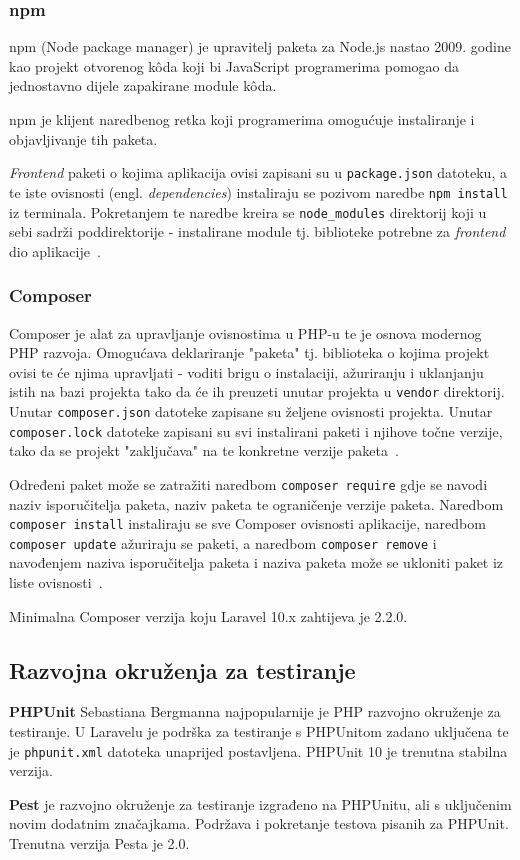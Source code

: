\subsubsection{npm}
npm (Node package manager) je upravitelj paketa za Node.js nastao 2009. godine kao projekt otvorenog k\^oda koji bi JavaScript programerima pomogao da jednostavno dijele zapakirane module k\^oda.

npm je klijent naredbenog retka koji programerima omogućuje instaliranje i objavljivanje tih paketa.

\textit{Frontend} paketi o kojima aplikacija ovisi zapisani su u \texttt{package.json} datoteku, a te iste ovisnosti (engl. \textit{dependencies}) instaliraju se pozivom naredbe \texttt{npm install} iz terminala. Pokretanjem te naredbe kreira se \texttt{node\_modules} direktorij koji u sebi sadrži poddirektorije - instalirane module tj. biblioteke potrebne za \textit{frontend} dio aplikacije~\cite{npm}.

\subsubsection{Composer}
Composer je alat za upravljanje ovisnostima u PHP-u te je osnova modernog PHP razvoja. Omogućava deklariranje "paketa" tj. biblioteka o kojima projekt ovisi te će njima upravljati - voditi brigu o instalaciji, ažuriranju i uklanjanju istih na bazi projekta tako da će ih preuzeti unutar projekta u \texttt{vendor} direktorij. Unutar \texttt{composer.json}
datoteke zapisane su željene ovisnosti projekta. Unutar \texttt{composer.lock} datoteke zapisani su svi instalirani paketi i njihove točne verzije, tako da se projekt "zaključava" na te konkretne verzije paketa~\cite{composerIntro}.

Određeni paket može se zatražiti naredbom \texttt{composer require} gdje se navodi naziv isporučitelja paketa, naziv paketa te ograničenje verzije paketa. Naredbom \texttt{composer install} instaliraju se sve Composer ovisnosti aplikacije, naredbom \texttt{composer update} ažuriraju se paketi, a naredbom \texttt{composer remove} i navođenjem naziva isporučitelja paketa i naziva paketa može se ukloniti paket iz liste ovisnosti~\cite{composerUsage}.

Minimalna Composer verzija koju Laravel 10.x zahtijeva je 2.2.0.

\subsection{Razvojna okruženja za testiranje}
\textbf{PHPUnit} Sebastiana Bergmanna najpopularnije je PHP razvojno okruženje za testiranje. U Laravelu je podrška za testiranje s PHPUnitom zadano uključena te je \texttt{phpunit.xml} datoteka unaprijed postavljena. PHPUnit 10 je trenutna stabilna verzija.

\textbf{Pest} je razvojno okruženje za testiranje izgrađeno na PHPUnitu, ali s uključenim novim dodatnim značajkama. Podržava i pokretanje testova pisanih za PHPUnit. Trenutna verzija Pesta je 2.0.